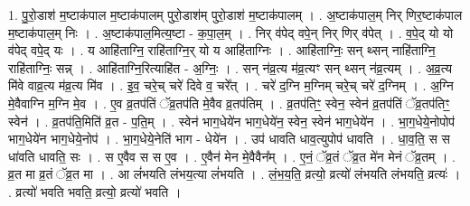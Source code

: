 \documentclass[17pt]{extarticle}
\begin{document}
1. पु॒रो॒डाश॑ म॒ष्टाक॑पाल म॒ष्टाक॑पालम् पुरो॒डाश॑म् पुरो॒डाश॑ म॒ष्टाक॑पालम् । . अ॒ष्टाक॑पाल॒म् निर् णिर॒ष्टाक॑पाल म॒ष्टाक॑पाल॒म् निः । . अ॒ष्टाक॑पाल॒मित्य॒ष्टा - क॒पा॒ल॒म् । . निर् व॑पेद् वपे॒न् निर् णिर् व॑पेत् । . व॒पे॒द् यो यो व॑पेद् वपे॒द् यः । . य आहि॑ताग्नि॒ राहि॑ताग्नि॒र् यो य आहि॑ताग्निः । . आहि॑ताग्निः॒ सन् थ्सन् नाहि॑ताग्नि॒ राहि॑ताग्निः॒ सन्न् । . आहि॑ताग्नि॒रित्याहि॑त - अ॒ग्निः॒ । . सन् न॑व्र॒त्य म॑व्र॒त्यꣳ सन् थ्सन् न॑व्र॒त्यम् । . अ॒व्र॒त्य मि॑वे वाव्र॒त्य म॑व्र॒त्य मि॑व । . इ॒व॒ चरे॒च् चरे॑ दिवे व॒ चरे᳚त् । . चरे॑ द॒ग्नि म॒ग्निम् चरे॒च् चरे॑ द॒ग्निम् । . अ॒ग्नि मे॒वैवाग्नि म॒ग्नि मे॒व । . ए॒व व्र॒तप॑तिं ॅव्र॒तप॑ति मे॒वैव व्र॒तप॑तिम् । . व्र॒तप॑तिꣳ॒॒ स्वेन॒ स्वेन॑ व्र॒तप॑तिं ॅव्र॒तप॑तिꣳ॒॒ स्वेन॑ । . व्र॒तप॑ति॒मिति॑ व्र॒त - प॒ति॒म् । . स्वेन॑ भाग॒धेये॑न भाग॒धेये॑न॒ स्वेन॒ स्वेन॑ भाग॒धेये॑न । . भा॒ग॒धेये॒नोपोप॑ भाग॒धेये॑न भाग॒धेये॒नोप॑ । . भा॒ग॒धेये॒नेति॑ भाग - धेये॑न । . उप॑ धावति धाव॒त्युपोप॑ धावति । . धा॒व॒ति॒ स स धा॑वति धावति॒ सः । . स ए॒वैव स स ए॒व । . ए॒वैन॑ मेन मे॒वैवैन᳚म् । . ए॒नं॒ ॅव्र॒तं ॅव्र॒त मे॑न मेनं ॅव्र॒तम् । . व्र॒त मा व्र॒तं ॅव्र॒त मा । . आ लं॑भयति लंभय॒त्या लं॑भयति । . लं॒भ॒य॒ति॒ व्रत्यो॒ व्रत्यो॑ लंभयति लंभयति॒ व्रत्यः॑ । . व्रत्यो॑ भवति भवति॒ व्रत्यो॒ व्रत्यो॑ भवति । \newline
\end{document}
